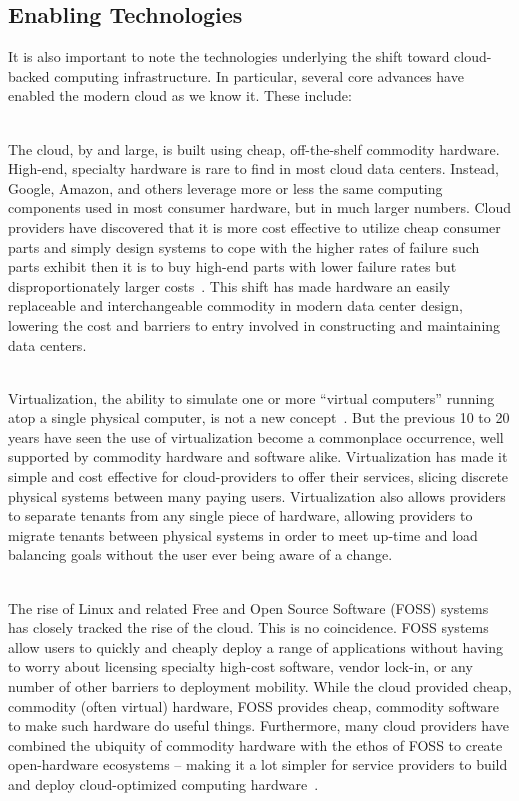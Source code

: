 \subsection{Enabling Technologies}

It is also important to note the technologies underlying the shift
toward cloud-backed computing infrastructure. In particular, several
core advances have enabled the modern cloud as we know it. These
include:

\begin{packed_desc}
\item[Commoditization of Hardware] \hfill \\ The cloud, by and large,
  is built using cheap, off-the-shelf commodity hardware. High-end,
  specialty hardware is rare to find in most cloud data
  centers. Instead, Google, Amazon, and others leverage more or less
  the same computing components used in most consumer hardware, but in
  much larger numbers. Cloud providers have discovered that it is more
  cost effective to utilize cheap consumer parts and simply design
  systems to cope with the higher rates of failure such parts exhibit
  then it is to buy high-end parts with lower failure rates but
  disproportionately larger costs~\cite{atwood2007}. This shift has
  made hardware an easily replaceable and interchangeable commodity in
  modern data center design, lowering the cost and barriers to entry
  involved in constructing and maintaining data centers.
\item[Virtualization] \hfill \\ Virtualization, the ability to
  simulate one or more ``virtual computers'' running atop a single
  physical computer, is not a new concept~\cite{goldberg1974}. But the
  previous 10 to 20 years have seen the use of virtualization become a
  commonplace occurrence, well supported by commodity hardware and
  software alike. Virtualization has made it simple and cost effective
  for cloud-providers to offer their services, slicing discrete
  physical systems between many paying users. Virtualization also
  allows providers to separate tenants from any single piece of
  hardware, allowing providers to migrate tenants between physical
  systems in order to meet up-time and load balancing goals without
  the user ever being aware of a change.
\item[Free and Open Source Software (and Hardware)] \hfill \\ The rise
  of Linux and related Free and Open Source Software (FOSS) systems
  has closely tracked the rise of the cloud. This is no
  coincidence. FOSS systems allow users to quickly and cheaply deploy
  a range of applications without having to worry about licensing
  specialty high-cost software, vendor lock-in, or any number of other
  barriers to deployment mobility. While the cloud provided cheap,
  commodity (often virtual) hardware, FOSS provides cheap, commodity
  software to make such hardware do useful things. Furthermore, many
  cloud providers have combined the ubiquity of commodity hardware
  with the ethos of FOSS to create open-hardware ecosystems -- making
  it a lot simpler for service providers to build and deploy
  cloud-optimized computing hardware~\cite{opencompute}.
\end{packed_desc}

